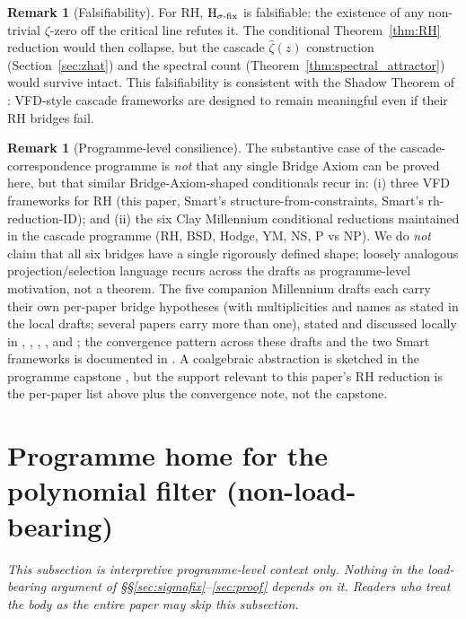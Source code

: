 \documentclass[11pt, a4paper]{amsart}
\theoremstyle{definition}
\newtheorem{remark}[theorem]{Remark}
\begin{document}
\begin{remark}[Falsifiability]\label{rmk:bridge_falsifiable}
For RH, $\textup{H}_{\sigma\text{-fix}}$ is falsifiable: the
existence of any non-trivial $\zeta$-zero off the critical line
refutes it.  The conditional Theorem~\ref{thm:RH} reduction would
then collapse, but the cascade $\widehat\zeta(z)$ construction
(Section~\ref{sec:zhat}) and the spectral count
(Theorem~\ref{thm:spectral_attractor}) would survive intact.
This falsifiability is consistent with the Shadow Theorem of
\cite[Section 4]{SmartPaperC}: VFD-style cascade frameworks are
designed to remain meaningful even if their RH bridges fail.
\end{remark}

\begin{remark}[Programme-level consilience]\label{rmk:consilience}
The substantive case of the cascade-correspondence programme is
\emph{not} that any single Bridge Axiom can be proved here, but
that similar Bridge-Axiom-shaped conditionals recur in: (i) three
VFD frameworks for RH (this paper, Smart's
structure-from-constraints, Smart's rh-reduction-ID); and
(ii) the six Clay Millennium conditional reductions maintained in
the cascade programme (RH, BSD, Hodge, YM, NS, P vs NP).  We do
\emph{not} claim that all six bridges have a single rigorously
defined shape; loosely analogous projection/selection language
recurs across the drafts as programme-level motivation, not a
theorem.  The five companion Millennium drafts each carry their
own per-paper bridge hypotheses (with multiplicities and names as
stated in the local drafts; several papers carry more than one),
stated and discussed locally in
\cite{MillenniumBSDformal}, \cite{MillenniumHodgeformal},
\cite{MillenniumYM}, \cite{MillenniumNSformal}, and
\cite{MillenniumPNPformal}; the convergence pattern across these
drafts and the two Smart frameworks is documented in
\cite{ConvergenceWithSmart}.  A coalgebraic abstraction is sketched
in the programme capstone \cite{CascadeCapstoneCoalgebra}, but the
support relevant to this paper's RH reduction is the per-paper
list above plus the convergence note, not the capstone.
\end{remark}

\section{Programme home for the polynomial filter (non-load-bearing)}\label{sec:aria_home}

\emph{This subsection is interpretive programme-level context only.
Nothing in the load-bearing argument of \S\S\ref{sec:sigmafix}--\ref{sec:proof}
depends on it.  Readers who treat the body as the entire paper may
skip this subsection.}\medskip
\end{document}
